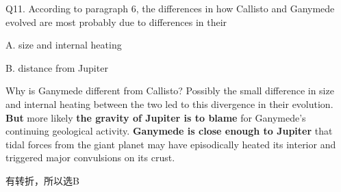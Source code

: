 \begin{blk}
    \begin{qst}
        Q11. According to paragraph 6, the differences in how Callisto and Ganymede evolved are most probably due to differences in their
    \end{qst}

    \begin{chc}
        A. size and internal heating

        B. distance from Jupiter
    \end{chc}

    \begin{psgq}
        Why is Ganymede different from Callisto? Possibly the small difference in size and internal heating between the two led to this divergence in their evolution. \textbf{But} more likely \textbf{the gravity of Jupiter is to blame} for Ganymede’s continuing geological activity. \textbf{Ganymede is close enough to Jupiter} that tidal forces from the giant planet may have episodically heated its interior and triggered major convulsions on its crust.
    \end{psgq}

    \begin{nlz}
        有转折，所以选B
    \end{nlz}
\end{blk}
